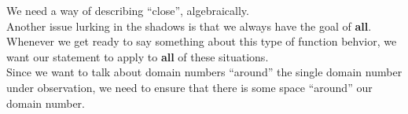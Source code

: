 \documentclass{ximera}
\begin{document}
We need a way of describing ``close'', algebraically.  \\


Another issue lurking in the shadows is that we always have the goal of \textbf{\textcolor{red!80!black}{all}}. Whenever we get ready to say something about this type of function behvior, we want our statement to apply to \textbf{\textcolor{red!80!black}{all}} of these situations. \\

Since we want to talk about domain numbers ``around'' the single domain number under observation, we need to ensure that there is some space ``around'' our domain number.
\end{document}
